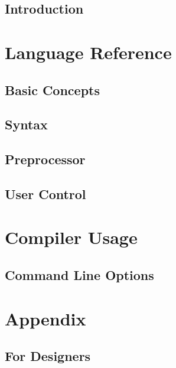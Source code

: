 \documentclass[10pt,oneside]{book}
\begin{document}

\frontmatter
\tableofcontents
\mainmatter
\chapter{Introduction}\label{sec:intro}
\part{Language Reference}
\chapter{Basic Concepts}\label{sec:basic concepts}
\chapter{Syntax}\label{sec:syntax}
\chapter{Preprocessor}\label{sec:pp}
\chapter{User Control}\label{sec:user control}

\part{Compiler Usage}
\chapter{Command Line Options}\label{sec:command line opt}

\part{Appendix}
\appendix
{}
\printglossary[nonumberlist=true, style=altlist, type=main]

\chapter{For \vperl{} Designers}\label{sec:for vperl}
\end{document}
